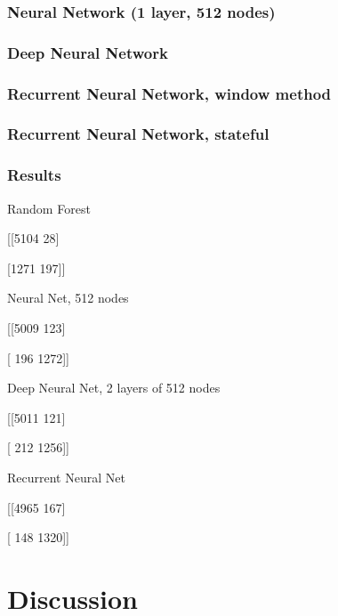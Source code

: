 \documentclass[12pt,a4paper]{article}
\begin{document}
\subsubsection{Neural Network (1 layer, 512 nodes) }

\subsubsection{Deep Neural Network}

\subsubsection{Recurrent Neural Network, window method}

\subsubsection{Recurrent Neural Network, stateful}

\subsubsection{Results}
Random Forest 

[[5104   28] 

 [1271  197]] 
 
Neural Net, 512 nodes

[[5009  123]

 [ 196 1272]]

Deep Neural Net, 2 layers of 512 nodes

[[5011  121]

 [ 212 1256]]
 
Recurrent Neural Net 

[[4965  167]

 [ 148 1320]]
 
\section{Discussion}

\printbibliography

 
\end{document}
